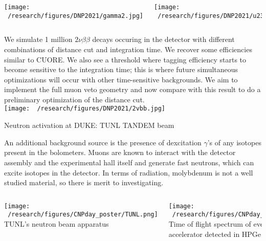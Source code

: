 \documentclass[final]{beamer}
\newlength{\colwidth}
\begin{document}
\begin{frame}[t]
\begin{columns}[t]
\begin{column}{\colwidth}
\begin{columns}[c]
        \column{.5\colwidth} %
        \texttt{[image: ~/research/figures/DNP2021/gamma2.jpg]}
        
        \column{.5\colwidth} %
        \texttt{[image: ~/research/figures/DNP2021/u238.jpg]}
      
      \end{columns}
      \vspace{1cm}

    We simulate 1 million $2\nu\beta\beta$ decays occuring in the detector with different combinations of distance cut and integration time. We recover some efficiencies similar to CUORE. We also see a threshold where tagging efficiency starts to become sensitive to the integration time; this is where future simultaneous optimizations will occur with other time-sensitive backgrounds. We aim to implement the full muon veto geometry and now compare with this result to do a preliminary optimization of the distance cut.
    \\
    \texttt{[image: ~/research/figures/DNP2021/2vbb.jpg]}
  
  \begin{block}{Neutron activation at DUKE: TUNL TANDEM beam}

  \vspace{1cm}
  An additional background source is the presence of dexcitation $\gamma$'s of any isotopes present in the bolometers. Muons are known to interact with the detector assembly and the experimental hall itself and generate fast neutrons, which can excite isotopes in the detector. In terms of radiation, molybdenum is not a well studied material, so there is merit to investigating. 


  \begin{columns}[c] %
      
      \column{.5\colwidth} %
      \texttt{[image: ~/research/figures/CNPday\_poster/TUNL.png]}
      {\footnotesize TUNL's neutron beam apparatus}    
      
      \column{.5\colwidth} %
      \texttt{[image: ~/research/figures/CNPday\_poster/8MeV\_TOF.png]}
      {\footnotesize Time of flight spectrum of events from TANDEM accelerator detected in HPGe} 
  \end{columns}


\end{block}
\end{column}
\end{columns}
\end{frame}
\end{document}
